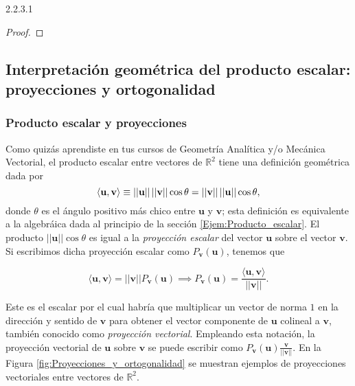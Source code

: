 \begin{teorema} {2.2.3.1}
\begin{proof}
\end{proof}
\end{teorema}

\newpage
\subsection{Interpretación geométrica del producto escalar: proyecciones y ortogonalidad}\label{Subsec:Interpretación geométrica del producto escalar} 

\subsubsection{Producto escalar y proyecciones} \label{Subsec:Producto_escalar_y_proyecciones}

Como quizás aprendiste en tus cursos de Geometría Analítica y/o Mecánica Vectorial, el producto escalar entre vectores de $\mathbb{R}^2$ tiene una definición geométrica dada por $$\langle\mathbf{u},\mathbf{v}\rangle\equiv ||\mathbf{u}||\hspace{0.5mm}||\mathbf{v}||\cos{\theta}=||\mathbf{v}||\hspace{0.5mm} ||\mathbf{u}||\cos{\theta},$$ \noindent donde $\theta$ es el ángulo positivo más chico entre $\mathbf{u}$ y $\mathbf{v}$; esta definición es equivalente a la algebráica dada al principio de la sección \ref{Ejem:Producto_escalar}. El producto $||\mathbf{u}||\cos{\theta}$ es igual a la \emph{proyección escalar} del vector $\mathbf{u}$ sobre el vector $\mathbf{v}$. Si escribimos dicha proyección escalar como $P_{\mathbf{v}}(\mathbf{u})$, tenemos que

$$\langle\mathbf{u},\mathbf{v}\rangle=||\mathbf{v}||P_{\mathbf{v}}(\mathbf{u}) \implies P_{\mathbf{v}}(\mathbf{u})=\frac{\langle\mathbf{u},\mathbf{v}\rangle}{||\mathbf{v}||}.$$ 

\noindent Este es el escalar por el cual habría que multiplicar un vector de norma $1$ en la dirección y sentido de $\mathbf{v}$ para obtener el vector componente de $\mathbf{u}$ colineal a $\mathbf{v}$, también conocido como \emph{proyección vectorial}. Empleando esta notación, la proyección vectorial de $\mathbf{u}$ sobre $\mathbf{v}$ se puede escribir como $P_{\mathbf{v}}(\mathbf{u})\frac{\mathbf{v}}{||\mathbf{v}||} .$ En la Figura \ref{fig:Proyecciones_y_ortogonalidad} se muestran ejemplos de proyecciones vectoriales entre vectores de $\mathbb{R}^2$.

